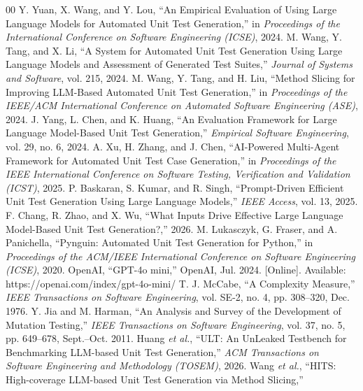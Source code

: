 \documentclass[conference]{IEEEtran}
\begin{document}
\begin{thebibliography}{00}
Y. Yuan, X. Wang, and Y. Lou, ``An Empirical Evaluation of Using Large Language Models for Automated Unit Test Generation,'' in \textit{Proceedings of the International Conference on Software Engineering (ICSE)}, 2024.
M. Wang, Y. Tang, and X. Li, ``A System for Automated Unit Test Generation Using Large Language Models and Assessment of Generated Test Suites,'' \textit{Journal of Systems and Software}, vol. 215, 2024.
M. Wang, Y. Tang, and H. Liu, ``Method Slicing for Improving LLM-Based Automated Unit Test Generation,'' in \textit{Proceedings of the IEEE/ACM International Conference on Automated Software Engineering (ASE)}, 2024.
J. Yang, L. Chen, and K. Huang, ``An Evaluation Framework for Large Language Model-Based Unit Test Generation,'' \textit{Empirical Software Engineering}, vol. 29, no. 6, 2024.
A. Xu, H. Zhang, and J. Chen, ``AI-Powered Multi-Agent Framework for Automated Unit Test Case Generation,'' in \textit{Proceedings of the IEEE International Conference on Software Testing, Verification and Validation (ICST)}, 2025.
P. Baskaran, S. Kumar, and R. Singh, ``Prompt-Driven Efficient Unit Test Generation Using Large Language Models,'' \textit{IEEE Access}, vol. 13, 2025.
F. Chang, R. Zhao, and X. Wu, ``What Inputs Drive Effective Large Language Model-Based Unit Test Generation?,'' 2026.
M. Lukasczyk, G. Fraser, and A. Panichella, ``Pynguin: Automated Unit Test Generation for Python,'' in \textit{Proceedings of the ACM/IEEE International Conference on Software Engineering (ICSE)}, 2020.
OpenAI,
``GPT-4o mini,''
OpenAI, Jul. 2024.
[Online]. Available: https://openai.com/index/gpt-4o-mini/
T. J. McCabe,
``A Complexity Measure,''
\textit{IEEE Transactions on Software Engineering},
vol. SE-2,
no. 4,
pp. 308--320,
Dec. 1976.
Y. Jia and M. Harman,
``An Analysis and Survey of the Development of Mutation Testing,''
\textit{IEEE Transactions on Software Engineering},
vol. 37,
no. 5,
pp. 649--678,
Sept.--Oct. 2011.
Huang \textit{et al.},
``ULT: An UnLeaked Testbench for Benchmarking LLM-based Unit Test Generation,''
\textit{ACM Transactions on Software Engineering and Methodology (TOSEM)}, 2026.
Wang \textit{et al.},
``HITS: High-coverage LLM-based Unit Test Generation via Method Slicing,''

\end{thebibliography}
\end{document}
